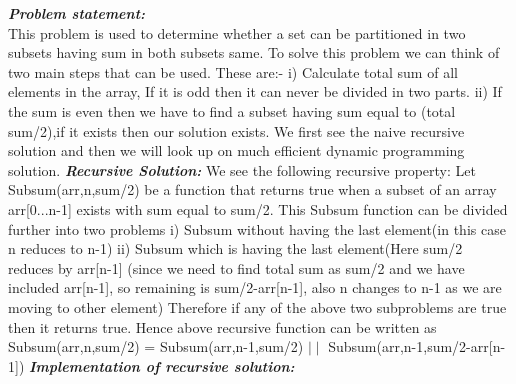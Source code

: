 \documentclass[12pt]{book}
\begin{document}
\textbf{\textit{Problem statement:}}\\
This problem is used to determine whether a set can be partitioned in two subsets having sum in both subsets same.\newline
To solve this problem we can think of two main steps that can be used. These are:-\newline
i) Calculate total sum of all elements in the array, If it is odd then it can never be divided in two parts.\newline
ii) If the sum is even then we have to find a subset having sum equal to (total sum/2),if it exists then our solution exists.\newline\newline
We first see the naive recursive solution and then we will look up on much efficient dynamic programming solution.\newline\newline
\textbf{\textit{Recursive Solution:}}\newline\newline
We see the following recursive property:\newline
Let Subsum(arr,n,sum/2) be a function that returns true when a subset of an array arr[0...n-1] exists with sum equal to sum/2.\newline
This Subsum function can be divided further into two problems\newline
i) Subsum without having the last element(in this case n reduces to n-1)
ii) Subsum which is having the last element(Here sum/2 reduces by arr[n-1] (since we need to find total sum as sum/2 and we have included arr[n-1], so remaining is sum/2-arr[n-1], also n changes to n-1 as we are moving to other element)\newline
Therefore if any of the above two subproblems are true then it returns true.\newline
Hence above recursive function can be written as\newline
Subsum(arr,n,sum/2) = Subsum(arr,n-1,sum/2) $\mid\mid$ Subsum(arr,n-1,sum/2-arr[n-1])\newline\newline
\textbf{\textit{Implementation of recursive solution:}}\newline
\end{document}
